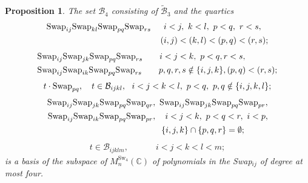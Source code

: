 \documentclass[12pt,dvipsnames,accepted=2016-08-18,a4paper,onecolumn]{quantumarticle}
\numberwithin{equation}{section}
\newtheorem{proposition}[theorem]{Proposition}
\theoremstyle{definition}
\begin{document}
\begin{proposition}
	The set $\mathcal{B}_4$ consisting of $\tilde{\mathcal{B}}_3$ and the quartics
	\begin{equation}\label{eq: type 8}
		\begin{split}
			\textnormal{Swap}_{ij} \textnormal{Swap}_{kl} \textnormal{Swap}_{pq} \textnormal{Swap}_{rs} \quad \ \,
			&i < j, \ k < l,\  p < q,\ r < s,  \\ (&i,j) < (k,l) < (p,q)<(r,s);\\
		\end{split}
	\end{equation}
\vspace{0.1mm}
	\begin{equation}\label{eq: type 7}
		\begin{split}
			&\textnormal{Swap}_{ij} \textnormal{Swap}_{jk} \textnormal{Swap}_{pq} \textnormal{Swap}_{rs}\quad \quad  i < j < k,\  p<q, r<s, \\
			 &\textnormal{Swap}_{ij} \textnormal{Swap}_{ik} \textnormal{Swap}_{pq} \textnormal{Swap}_{rs}  \quad\quad p,q,r,s \notin \{i,j,k\}, (p,q)<(r,s);\\
		\end{split}
	\end{equation}
\vspace{0.1mm}
	\begin{equation}\label{eq: type 6-a}
		\begin{split}
			t\cdot\textnormal{Swap}_{pq}, \quad t \in \mathcal{B}_{ijkl},\ \ i < j < k < l,\ p<q,\ p,q \notin \{i,j,k,l\};\\		
		\end{split}
	\end{equation}
\vspace{0.1mm}
	\begin{equation}\label{eq: type 6-b}
		\begin{split}
			\textnormal{Swap}_{ij} \textnormal{Swap}_{jk} \textnormal{Swap}_{pq} \textnormal{Swap}_{qr}&, \ 
			\textnormal{Swap}_{ij} \textnormal{Swap}_{jk} \textnormal{Swap}_{pq} \textnormal{Swap}_{pr},\\
			\textnormal{Swap}_{ij} \textnormal{Swap}_{ik} \textnormal{Swap}_{pq} \textnormal{Swap}_{pr}&,
			\quad i < j < k, \ p<q<r, \ i<p,\\	
			 &\quad\{i,j,k\} \cap \{p,q,r\} = \emptyset;	
		\end{split}
	\end{equation}
\vspace{2mm}
	\begin{equation}\label{eq: type 55}
		\begin{split}
			t \in \mathcal{B}_{ijklm},\ \quad \quad \quad i < j < k < l < m;
		\end{split}
	\end{equation}
	is a basis of the subspace of $M^{\text{Sw}_4}_n(\mathbb{C})$ of polynomials in the Swap$_{ij}$ of degree at most four. 
\end{proposition}
\end{document}
